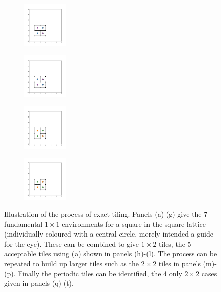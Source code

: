 \begin{figure}[bt]
	\vspace{2mm}    
     \begin{subfigure}[b]{0.19\textwidth}
         \centering
         \includegraphics[height=2.2cm]{./figures/procrystals/2x2_0p.pdf}
         \caption{}
         \label{fig:et2x2p_0}
     \end{subfigure}
     \hfill
      \begin{subfigure}[b]{0.19\textwidth}
         \centering
         \includegraphics[height=2.2cm]{./figures/procrystals/2x2_2p.pdf}
         \caption{}
         \label{fig:et2x2p_1}
     \end{subfigure}
     \hfill
      \begin{subfigure}[b]{0.19\textwidth}
         \centering
         \includegraphics[height=2.2cm]{./figures/procrystals/2x2_1p.pdf}
         \caption{}
         \label{fig:et2x2p_2}
     \end{subfigure}
     \hfill
      \begin{subfigure}[b]{0.19\textwidth}
         \centering
         \includegraphics[height=2.2cm]{./figures/procrystals/2x2_3p.pdf}
         \caption{}
         \label{fig:et2x2p_3}
     \end{subfigure}
     \hfill
    
     \caption{Illustration of the process of exact tiling. Panels (a)\--(g) give the 7 fundamental $1\times 1$ environments for a square in the square lattice (individually coloured with a central circle, merely intended a guide for the eye). These can be combined to give $1\times 2$ tiles, the 5 acceptable tiles using (a) shown in panels (h)\--(l). The process can be repeated to build up larger tiles such as the $2\times 2$ tiles in panels (m)\--(p). Finally the periodic tiles can be identified, the 4 only $2\times 2$ cases given in panels (q)\--(t).}
     \label{fig:exacttiling}
\end{figure}

